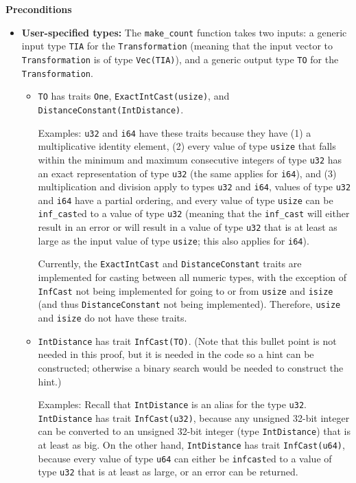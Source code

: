 \documentclass[12pt,letterpaper]{article}
\theoremstyle{definition}
\begin{document}
\textbf{Preconditions}
\begin{itemize}
    \item \textbf{User-specified types:} The \texttt{make\_count} function takes two inputs: a generic input type \texttt{TIA} for the \texttt{Transformation} (meaning that the input vector to \texttt{Transformation} is of type \texttt{Vec(TIA)}), and a generic output type \texttt{TO} for the \texttt{Transformation}.
    
    \begin{itemize}
        \item \texttt{TO} has traits \texttt{One}, \texttt{ExactIntCast(usize)}, and \texttt{DistanceConstant(IntDistance)}.
        
        Examples: \texttt{u32} and \texttt{i64} have these traits because they have (1) a multiplicative identity element, (2) every value of type \texttt{usize} that falls within the minimum and maximum consecutive integers of type \texttt{u32} has an exact representation of type \texttt{u32} (the same applies for \texttt{i64}), and (3) multiplication and division apply to types \texttt{u32} and \texttt{i64}, values of type \texttt{u32} and \texttt{i64} have a partial ordering, and every value of type \texttt{usize} can be \texttt{inf\_cast}ed to a value of type \texttt{u32} (meaning that the \texttt{inf\_cast} will either result in an error or will result in a value of type \texttt{u32} that is at least as large as the input value of type \texttt{usize}; this also applies for \texttt{i64}).
        
        Currently, the \texttt{ExactIntCast} and \texttt{DistanceConstant} traits are implemented for casting between all numeric types, with the exception of \texttt{InfCast} not being implemented for going to or from \texttt{usize} and \texttt{isize} (and thus \texttt{DistanceConstant} not being implemented). Therefore, \texttt{usize} and \texttt{isize} do not have these traits. 
        
        \item \texttt{IntDistance} has trait \texttt{InfCast(TO)}. (Note that this bullet point is not needed in this proof, but it is needed in the code so a hint can be constructed; otherwise a binary search would be needed to construct the hint.)
        
        Examples: Recall that \texttt{IntDistance} is an alias for the type \texttt{u32}. \texttt{IntDistance} has trait \texttt{InfCast(u32)}, because any unsigned 32-bit integer can be converted to an unsigned 32-bit integer (type \texttt{IntDistance}) that is at least as big. On the other hand, \texttt{IntDistance} has trait \texttt{InfCast(u64)}, because every value of type \texttt{u64} can either be \texttt{infcast}ed to a value of type \texttt{u32} that is at least as large, or an error can be returned.
        

\end{itemize}
\end{itemize}
\end{document}

